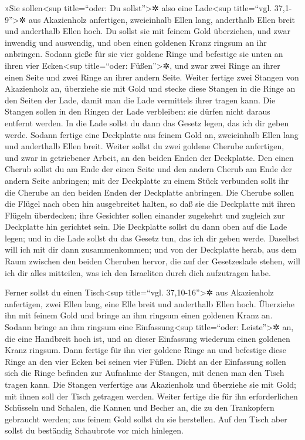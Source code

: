  »Sie sollen\textless sup title=``oder: Du
sollst''\textgreater✲ also eine Lade\textless sup title=``vgl.
37,1-9''\textgreater✲ aus Akazienholz anfertigen, zweieinhalb Ellen
lang, anderthalb Ellen breit und anderthalb Ellen hoch. 
Du sollst sie mit feinem Gold überziehen, und zwar inwendig und
auswendig, und oben einen goldenen Kranz ringsum an ihr anbringen.
 Sodann gieße für sie vier goldene Ringe und befestige
sie unten an ihren vier Ecken\textless sup title=``oder:
Füßen''\textgreater✲, und zwar zwei Ringe an ihrer einen Seite und zwei
Ringe an ihrer andern Seite.  Weiter fertige zwei Stangen
von Akazienholz an, überziehe sie mit Gold  und stecke
diese Stangen in die Ringe an den Seiten der Lade, damit man die Lade
vermittels ihrer tragen kann.  Die Stangen sollen in den
Ringen der Lade verbleiben: sie dürfen nicht daraus entfernt werden.
 In die Lade sollst du dann das Gesetz legen, das ich dir
geben werde.  Sodann fertige eine Deckplatte aus feinem
Gold an, zweieinhalb Ellen lang und anderthalb Ellen breit.
 Weiter sollst du zwei goldene Cherube anfertigen, und
zwar in getriebener Arbeit, an den beiden Enden der Deckplatte.
 Den einen Cherub sollst du am Ende der einen Seite und
den andern Cherub am Ende der andern Seite anbringen; mit der Deckplatte
zu einem Stück verbunden sollt ihr die Cherube an den beiden Enden der
Deckplatte anbringen.  Die Cherube sollen die Flügel nach
oben hin ausgebreitet halten, so daß sie die Deckplatte mit ihren
Flügeln überdecken; ihre Gesichter sollen einander zugekehrt und
zugleich zur Deckplatte hin gerichtet sein.  Die
Deckplatte sollst du dann oben auf die Lade legen; und in die Lade
sollst du das Gesetz tun, das ich dir geben werde. 
Daselbst will ich mit dir dann zusammenkommen; und von der Deckplatte
herab, aus dem Raum zwischen den beiden Cheruben hervor, die auf der
Gesetzeslade stehen, will ich dir alles mitteilen, was ich den
Israeliten durch dich aufzutragen habe.

 Ferner sollst du einen Tisch\textless sup title=``vgl.
37,10-16''\textgreater✲ aus Akazienholz anfertigen, zwei Ellen lang,
eine Elle breit und anderthalb Ellen hoch.  Überziehe ihn
mit feinem Gold und bringe an ihm ringsum einen goldenen Kranz an.
 Sodann bringe an ihm ringsum eine
Einfassung\textless sup title=``oder: Leiste''\textgreater✲ an, die eine
Handbreit hoch ist, und an dieser Einfassung wiederum einen goldenen
Kranz ringsum.  Dann fertige für ihn vier goldene Ringe
an und befestige diese Ringe an den vier Ecken bei seinen vier Füßen.
 Dicht an der Einfassung sollen sich die Ringe befinden
zur Aufnahme der Stangen, mit denen man den Tisch tragen kann.
 Die Stangen verfertige aus Akazienholz und überziehe sie
mit Gold; mit ihnen soll der Tisch getragen werden. 
Weiter fertige die für ihn erforderlichen Schüsseln und Schalen, die
Kannen und Becher an, die zu den Trankopfern gebraucht werden; aus
feinem Gold sollst du sie herstellen.  Auf den Tisch aber
sollst du beständig Schaubrote vor mich hinlegen.

